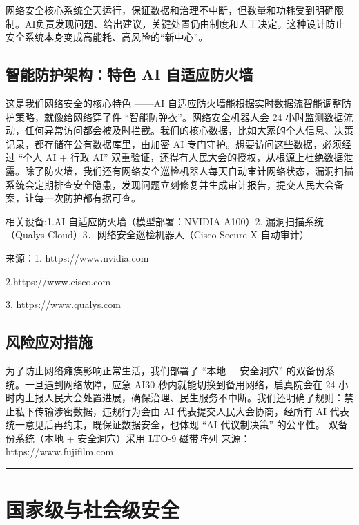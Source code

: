 网络安全核心系统全天运行，保证数据和治理不中断，但数量和功耗受到明确限制。AI负责发现问题、给出建议，关键处置仍由制度和人工决定。这种设计防止安全系统本身变成高能耗、高风险的``新中心''。

\subsection{智能防护架构：特色 AI 自适应防火墙}\label{ux667aux80fdux9632ux62a4ux67b6ux6784ux7279ux8272-ai-ux81eaux9002ux5e94ux9632ux706bux5899}

这是我们网络安全的核心特色 ------AI 自适应防火墙能根据实时数据流智能调整防护策略，就像给网络穿了件 ``智能防弹衣''。网络安全机器人会 24 小时监测数据流动，任何异常访问都会被及时拦截。我们的核心数据，比如大家的个人信息、决策记录，都存储在公有数据库里，由加密 AI 专门守护。想要访问这些数据，必须经过 ``个人 AI + 行政 AI'' 双重验证，还得有人民大会的授权，从根源上杜绝数据泄露。除了防火墙，我们还有网络安全巡检机器人每天自动审计网络状态，漏洞扫描系统会定期排查安全隐患，发现问题立刻修复并生成审计报告，提交人民大会备案，让每一次防护都有据可查。

相关设备:1.AI 自适应防火墙（模型部署：NVIDIA A100）2. 漏洞扫描系统（Qualys Cloud）3．网络安全巡检机器人（Cisco Secure-X 自动审计）

来源：1.
https://www.nvidia.com

2.https://www.cisco.com

 3.
https://www.qualys.com

\subsection{风险应对措施}\label{ux98ceux9669ux5e94ux5bf9ux63aaux65bd}

为了防止网络瘫痪影响正常生活，我们部署了 ``本地 + 安全洞穴'' 的双备份系统。一旦遇到网络故障，应急 AI30 秒内就能切换到备用网络，启真院会在 24 小时内上报人民大会处置进展，确保治理、民生服务不中断。我们还明确了规则：禁止私下传输涉密数据，违规行为会由 AI 代表提交人民大会协商，经所有 AI 代表统一意见后再约束，既保证数据安全，也体现 ``AI 代议制决策'' 的公平性。 双备份系统（本地 + 安全洞穴）采用 LTO-9 磁带阵列 来源：https://www.fujifilm.com

\begin{center}\rule{0.5\linewidth}{0.5pt}\end{center}

\section{国家级与社会级安全}\label{ux56fdux5bb6ux7ea7ux4e0eux793eux4f1aux7ea7ux5b89ux5168}

